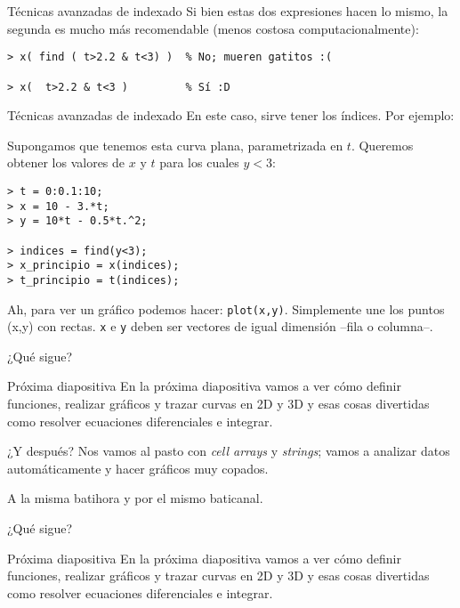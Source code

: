 \begin{frame}[fragile]{Técnicas avanzadas de indexado}
Si bien estas dos expresiones hacen lo mismo, la segunda es mucho más recomendable (menos costosa computacionalmente):

\begin{lstlisting}
> x( find ( t>2.2 & t<3) )  % No; mueren gatitos :(

> x(  t>2.2 & t<3 )         % Sí :D
\end{lstlisting}


\end{frame}

\begin{frame}[fragile]{Técnicas avanzadas de indexado}
En este caso, sirve tener los índices. Por ejemplo:

Supongamos que tenemos esta curva plana, parametrizada en $t$. Queremos obtener los valores de $x$ y $t$ para los cuales $y<3$:

\begin{lstlisting}
> t = 0:0.1:10;
> x = 10 - 3.*t;
> y = 10*t - 0.5*t.^2;

> indices = find(y<3);
> x_principio = x(indices);
> t_principio = t(indices);
\end{lstlisting}

Ah, para ver un gráfico podemos hacer: \verb!plot(x,y)!. Simplemente une los puntos (x,y) con rectas. \verb!x! e \verb!y! deben ser vectores de igual dimensión --fila o columna--.

\end{frame}

\begin{frame}{¿Qué sigue?}

\begin{alertblock}{Próxima diapositiva}
En la próxima diapositiva vamos a ver cómo definir funciones, realizar gráficos y trazar curvas en 2D y 3D y esas cosas divertidas como resolver ecuaciones diferenciales e integrar.
\end{alertblock}

\begin{alertblock}{¿Y después?}
Nos vamos al pasto con \emph{cell arrays} y \emph{strings}; vamos a analizar datos automáticamente y hacer gráficos muy copados.
\end{alertblock}

A la misma batihora y por el mismo baticanal.

\end{frame}

\begin{frame}{¿Qué sigue?}

\begin{alertblock}{Próxima diapositiva}
En la próxima diapositiva vamos a ver cómo definir funciones, realizar gráficos y trazar curvas en 2D y 3D y esas cosas divertidas como resolver ecuaciones diferenciales e integrar.
\end{alertblock}

\end{frame}

